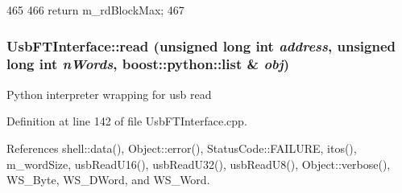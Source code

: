 \begin{DoxyCode}
465                      {
466     return m_rdBlockMax;
467   }
\end{DoxyCode}
\hypertarget{classUsbFTInterface_a682e63cb6168be314aa3cc6e6a10ec59}{
\subsubsection[{read}]{ UsbFTInterface::read (unsigned long int {\em address}, \/  unsigned long int {\em nWords}, \/  boost::python::list \& {\em obj})}}
\label{classUsbFTInterface_a682e63cb6168be314aa3cc6e6a10ec59}
Python interpreter wrapping for usb read 

Definition at line 142 of file UsbFTInterface.cpp.

References shell::data(), Object::error(), StatusCode::FAILURE, itos(), m\_\-wordSize, usbReadU16(), usbReadU32(), usbReadU8(), Object::verbose(), WS\_\-Byte, WS\_\-DWord, and WS\_\-Word.


